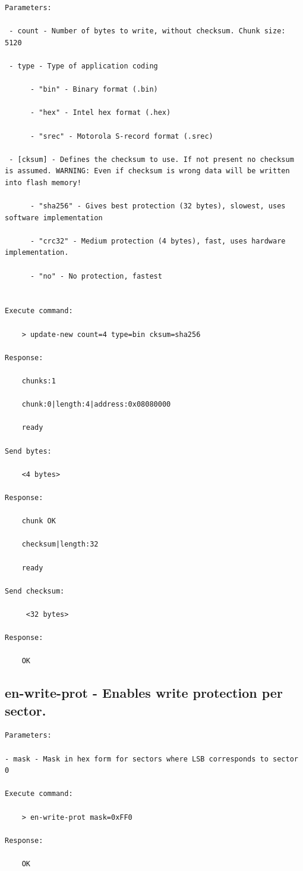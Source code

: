 \begin{lstlisting}
Parameters:

 - count - Number of bytes to write, without checksum. Chunk size: 5120
 
 - type - Type of application coding
       
      - "bin" - Binary format (.bin)
                
      - "hex" - Intel hex format (.hex)
      
      - "srec" - Motorola S-record format (.srec)
 
 - [cksum] - Defines the checksum to use. If not present no checksum is assumed. WARNING: Even if checksum is wrong data will be written into flash memory!
 
      - "sha256" - Gives best protection (32 bytes), slowest, uses software implementation
           
      - "crc32" - Medium protection (4 bytes), fast, uses hardware implementation.

      - "no" - No protection, fastest


Execute command: 

    > update-new count=4 type=bin cksum=sha256
    
Response: 

    chunks:1

    chunk:0|length:4|address:0x08080000

    ready
    
Send bytes:

    <4 bytes>
    
Response:

    chunk OK

    checksum|length:32

    ready
 
Send checksum:
     
     <32 bytes>
     
Response:
 
    OK
\end{lstlisting}

\subsection{en-write-prot - Enables write protection per sector.}
\label{bl_cmd:en-write-prot}

\begin{lstlisting}
Parameters:

- mask - Mask in hex form for sectors where LSB corresponds to sector 0

Execute command: 

    > en-write-prot mask=0xFF0
    
Response: 

    OK
\end{lstlisting}
    
